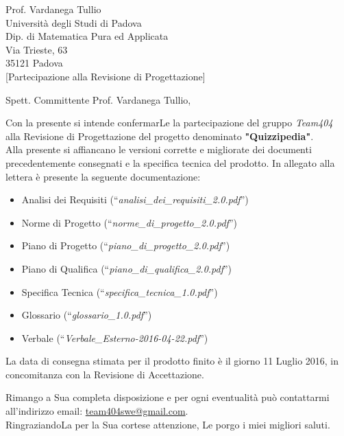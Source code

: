 \documentclass[boldsubject,shortindent,a4paper,11pt]{letteracdp}
\date{16 Maggio 2016}
\begin{document}
\begin{letter}{	Prof. Vardanega Tullio \\
				Universit\`a degli Studi di Padova \\
				Dip. di Matematica Pura ed Applicata \\
				Via Trieste, 63 \\
				35121 Padova\\
				}
[Partecipazione alla Revisione di Progettazione]
\opening{Spett. Committente Prof. Vardanega Tullio,}
\noindent
Con la presente si intende confermarLe la partecipazione del gruppo \emph{Team404} alla Revisione di Progettazione del progetto denominato \textbf{"Quizzipedia"}.
\\
\noindent
Alla presente si affiancano le versioni corrette e migliorate dei documenti precedentemente consegnati e la specifica tecnica del prodotto.
\newline
\noindent
In allegato alla lettera è presente la seguente documentazione:
\begin{itemize}
	\item Analisi dei Requisiti (``\textit{analisi\_dei\_requisiti\_2.0.pdf}'')
	\item Norme di Progetto (``\textit{norme\_di\_progetto\_2.0.pdf}'')
	\item Piano di Progetto (``\textit{piano\_di\_progetto\_2.0.pdf}'')
	\item Piano di Qualifica (``\textit{piano\_di\_qualifica\_2.0.pdf}'')
	\item Specifica Tecnica (``\textit{specifica\_tecnica\_1.0.pdf}'')
	\item Glossario (``\textit{glossario\_1.0.pdf}'')
	\item Verbale (``\textit{Verbale\_Esterno-2016-04-22.pdf}'')
\end{itemize}

\noindent

La data di consegna stimata per il prodotto finito è il giorno 11 Luglio 2016, in concomitanza con la Revisione di Accettazione.

\closing{Rimango a Sua completa disposizione e per ogni eventualit\`a pu\`o contattarmi all'indirizzo email: \url{team404swe@gmail.com}.\\RingraziandoLa per la Sua cortese attenzione, Le porgo i miei migliori saluti.}
\end{letter}
\end{document}
